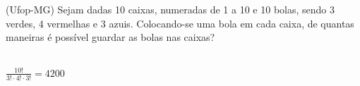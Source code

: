 \begin{ex}
(Ufop-MG) Sejam dadas 10 caixas, numeradas de 1 a 10 e 10 bolas, sendo 3 verdes, 4 vermelhas e 3 azuis. Colocando-se uma bola em cada caixa, de quantas maneiras é possível guardar as bolas nas caixas?
 \begin{sol}
   \phantom{A} \\
   $\frac{10!}{3!\cdot4!\cdot3!}=4200$
 \end{sol}
\end{ex}